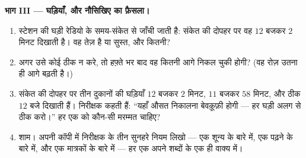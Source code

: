 \begin{problem}
\medskip\noindent\textbf{भाग III --- घड़ियाँ, और नौसिखिए का
फ़ैसला।}
\begin{enumerate}[resume]
  \item स्टेशन की घड़ी रेडियो के समय-संकेत से जाँची जाती है: संकेत
        की दोपहर पर वह $12$ बजकर $2$ मिनट दिखाती है। वह तेज़ है या
        सुस्त, और कितनी?
  \item अगर उसे कोई ठीक न करे, तो हफ़्ते भर बाद वह कितनी आगे निकल
        चुकी होगी? (वह रोज़ उतना ही आगे बढ़ती है।)
  \item संकेत की दोपहर पर तीन दुकानों की घड़ियाँ $12$ बजकर $2$
        मिनट, $11$ बजकर $58$ मिनट, और ठीक $12$ बजे दिखाती हैं।
        निरीक्षक कहती हैं: ``यहाँ औसत निकालना बेवक़ूफ़ी होगी ---
        हर घड़ी अलग से ठीक करो।'' हर एक को कौन-सी मरम्मत चाहिए?
  \item शाम। अपनी कॉपी में निरीक्षक के तीन सुनहरे नियम लिखो ---
        एक शून्य के बारे में, एक पढ़ने के बारे में, और एक मात्रकों
        के बारे में --- हर एक अपने शब्दों के एक ही वाक्य में।
\end{enumerate}
\end{problem}
